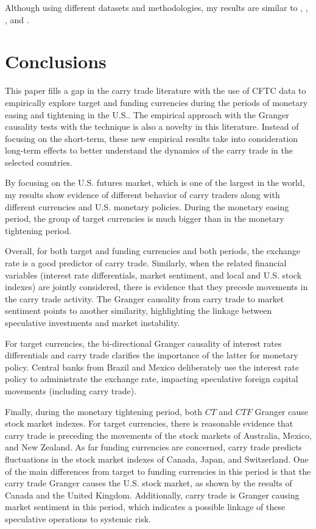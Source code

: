\documentclass[a4paper, twoside]{templates/ociamthesis}
\begin{document}
Although using different datasets and methodologies, my results are similar to \textcite{klitgaard2004}, \textcite{mogford2006}, \textcite{nishigaki2007}, \textcite{gubler2014} and \textcite{mulligan2018}.

\hypertarget{threefour}{%
\section{Conclusions}\label{threefour}}

This paper fills a gap in the carry trade literature with the use of CFTC data to empirically explore target and funding currencies during the periods of monetary easing and tightening in the U.S.. The empirical approach with the Granger causality tests with the \textcite{toda1995} technique is also a novelty in this literature. Instead of focusing on the short-term, these new empirical results take into consideration long-term effects to better understand the dynamics of the carry trade in the selected countries.

By focusing on the U.S. futures market, which is one of the largest in the world, my results show evidence of different behavior of carry traders along with different currencies and U.S. monetary policies. During the monetary easing period, the group of target currencies is much bigger than in the monetary tightening period.

Overall, for both target and funding currencies and both periods, the exchange rate is a good predictor of carry trade. Similarly, when the related financial variables (interest rate differentials, market sentiment, and local and U.S. stock indexes) are jointly considered, there is evidence that they precede movements in the carry trade activity. The Granger causality from carry trade to market sentiment points to another similarity, highlighting the linkage between speculative investments and market instability.

For target currencies, the bi-directional Granger causality of interest rates differentials and carry trade clarifies the importance of the latter for monetary policy. Central banks from Brazil and Mexico deliberately use the interest rate policy to administrate the exchange rate, impacting speculative foreign capital movements (including carry trade).

Finally, during the monetary tightening period, both \(CT\) and \(CTF\) Granger cause stock market indexes. For target currencies, there is reasonable evidence that carry trade is preceding the movements of the stock markets of Australia, Mexico, and New Zealand. As far funding currencies are concerned, carry trade predicts fluctuations in the stock market indexes of Canada, Japan, and Switzerland. One of the main differences from target to funding currencies in this period is that the carry trade Granger causes the U.S. stock market, as shown by the results of Canada and the United Kingdom. Additionally, carry trade is Granger causing market sentiment in this period, which indicates a possible linkage of these speculative operations to systemic risk.
\end{document}
